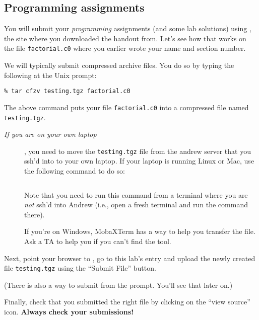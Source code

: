 \subsection*{Programming assignments}
\begin{part}
You will submit your \emph{programming} assignments (and some lab
solutions) using \autolab{}, the site where you downloaded the handout
from.  Let's see how that works on the file \lstinline'factorial.c0'
where you earlier wrote your name and section number.

We will typically submit compressed archive files.  You do so by
typing the following at the Unix prompt:

\lstinline[language={[coin]C}]'%

The above command puts your file \lstinline'factorial.c0' into a
compressed file named \lstinline'testing.tgz'.

\begin{description}
\item[{\em If you are on your own laptop}], you need to move the
    \lstinline'testing.tgz' file
    from the andrew server that you ssh'd into to your own laptop.
    If your laptop is running Linux or Mac, use the following command
    to do so:
        \begin{lstlisting}[language={[coin]C}]
% scp <your_id>@unix.andrew.cmu.edu:private/15122/lab01/handout/testing.tgz .
        \end{lstlisting}
Note that you need to run this command from a terminal where
    you are \emph{not} ssh'd into Andrew (i.e., open a fresh terminal
    and run the command there).

If you're on Windows, MobaXTerm has a way to help you transfer the file.
Ask a TA to help you if you can't find the tool.
\end{description}

Next, point your browser to \autolab, go to this lab's entry and
upload the newly created file \lstinline'testing.tgz' using the
``Submit File'' button.

(There is also a way to submit from the prompt.  You'll see that later
on.)

Finally, check that you submitted the right file by clicking on the
``view source'' icon.  \textbf{Always check your submissions!}
\end{part}
